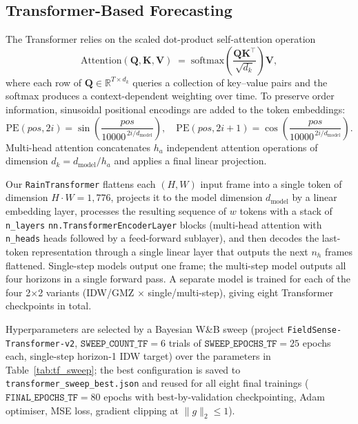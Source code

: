 \documentclass[12pt, a4paper]{article}
\begin{document}
\subsection{Transformer-Based Forecasting}\label{sec:tf}

The Transformer \cite{vaswani2017attention} relies on the scaled
dot-product self-attention operation
\begin{equation}
  \mathrm{Attention}(\mathbf{Q}, \mathbf{K}, \mathbf{V}) \;=\;
  \mathrm{softmax}\!\left(\frac{\mathbf{Q}\mathbf{K}^{\top}}{\sqrt{d_k}}\right)\mathbf{V},
  \label{eq:attention}
\end{equation}
where each row of \(\mathbf{Q}\in\mathbb{R}^{T\times d_k}\) queries a
collection of key--value pairs and the softmax produces a
context-dependent weighting over time. To preserve order information,
sinusoidal positional encodings are added to the token embeddings:
\begin{equation}
  \mathrm{PE}(pos, 2i) = \sin\!\left(\frac{pos}{10000^{\,2i/d_{\text{model}}}}\right), \quad
  \mathrm{PE}(pos, 2i+1) = \cos\!\left(\frac{pos}{10000^{\,2i/d_{\text{model}}}}\right). \label{eq:pe}
\end{equation}
Multi-head attention concatenates \(h_a\) independent attention
operations of dimension \(d_k = d_{\text{model}}/h_a\) and applies a
final linear projection.

Our \texttt{RainTransformer} flattens each \((H, W)\) input frame into
a single token of dimension \(H\cdot W = 1{,}776\), projects it to the
model dimension \(d_{\text{model}}\) by a linear embedding layer,
processes the resulting sequence of \(w\) tokens with a stack of
\texttt{n\_layers} \texttt{nn.TransformerEncoderLayer} blocks
(multi-head attention with \texttt{n\_heads} heads followed by a
feed-forward sublayer), and then decodes the last-token
representation through a single linear layer that outputs the next
\(n_h\) frames flattened. Single-step models output one frame; the
multi-step model outputs all four horizons in a single forward pass.
A separate model is trained for each of the four 2\(\times\)2 variants
(IDW/GMZ \(\times\) single/multi-step), giving eight Transformer
checkpoints in total.

Hyperparameters are selected by a Bayesian W\&B sweep (project
\texttt{FieldSense-Transformer-v2}, \(\texttt{SWEEP\_COUNT\_TF} = 6\)
trials of \(\texttt{SWEEP\_EPOCHS\_TF} = 25\) epochs each, single-step
horizon-1 IDW target) over the parameters in
Table~\ref{tab:tf_sweep}; the best configuration is saved to
\texttt{transformer\_sweep\_best.json} and reused for all eight final
trainings (\(\texttt{FINAL\_EPOCHS\_TF} = 80\) epochs with
best-by-validation checkpointing, Adam optimiser, MSE loss, gradient
clipping at \(\lVert g\rVert_2 \le 1\)).
\end{document}
